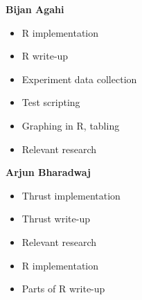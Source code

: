 \documentclass[titlepage, 11pt]{article}
\begin{document}
\textbf{Bijan Agahi}
\begin{itemize}
	\item R implementation
	\item R write-up
	\item Experiment data collection
	\item Test scripting
	\item Graphing in R, tabling
	\item Relevant research
\end{itemize}

\textbf{Arjun Bharadwaj}
\begin{itemize}
	\item Thrust implementation
	\item Thrust write-up
	\item Relevant research
	\item R implementation
	\item Parts of R write-up
\end{itemize}
\end{document}
